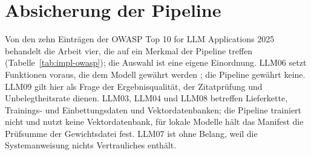 \documentclass[11pt,a4paper]{report}
\begin{document}
\section{Absicherung der Pipeline}
\label{sec:impl-absicherung}
\label{subsec:impl-injection}
\label{subsec:impl-datenschutz}
\label{subsec:impl-ausgabe}
\label{subsec:impl-verbrauch}

Von den zehn Einträgen der OWASP Top 10 for LLM Applications 2025
\cite{owaspllm2025} behandelt die Arbeit vier, die auf ein Merkmal der
Pipeline treffen (Tabelle~\ref{tab:impl-owasp}); die Auswahl ist eine
eigene Einordnung. LLM06 setzt Funktionen voraus, die dem Modell gewährt
werden \cite[LLM06:2025]{owaspllm2025}; die Pipeline gewährt keine.
LLM09 \cite[LLM09:2025]{owaspllm2025} gilt hier als Frage der
Ergebnisqualität, der Zitatprüfung und Unbelegtheitsrate dienen. LLM03,
LLM04 und LLM08 betreffen Lieferkette, Trainings- und Einbettungsdaten
und Vektordatenbanken; die Pipeline trainiert nicht und nutzt keine
Vektordatenbank, für lokale Modelle hält das Manifest die Prüfsumme der
Gewichtsdatei fest. LLM07 ist ohne Belang, weil die Systemanweisung
nichts Vertrauliches enthält.
\end{document}
